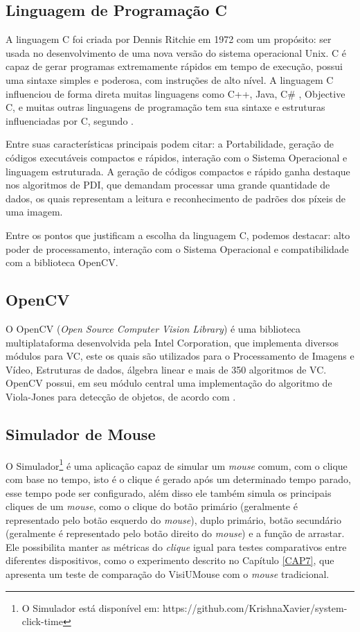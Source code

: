 \subsection{Linguagem de Programação C}

A linguagem C foi criada por Dennis Ritchie em 1972 com um propósito: ser usada no desenvolvimento de uma nova versão do sistema operacional Unix. C é capaz de gerar programas extremamente rápidos em tempo de execução, possui uma sintaxe simples e poderosa, com instruções de alto nível. A linguagem C influenciou de forma direta muitas linguagens como C++, Java, C\# , Objective C, e muitas outras linguagens de programação tem sua sintaxe e estruturas influenciadas por C, segundo .

Entre suas características principais podem citar: a Portabilidade, geração de códigos executáveis compactos e rápidos, interação com o Sistema Operacional e linguagem estruturada. A geração de códigos compactos e rápido ganha destaque nos algoritmos de PDI, que demandam processar uma grande quantidade de dados, os quais representam a leitura e reconhecimento de padrões dos píxeis de uma imagem.

Entre os pontos que justificam a escolha da linguagem C, podemos destacar: alto poder de processamento, interação com o Sistema Operacional e compatibilidade com a biblioteca OpenCV.

\subsection{OpenCV}

O OpenCV (\textit{Open Source Computer Vision Library}) é uma biblioteca multiplataforma desenvolvida pela Intel Corporation, que implementa diversos módulos para VC, este os quais são utilizados para o Processamento de Imagens e Vídeo, Estruturas de dados, álgebra linear e mais de 350 algoritmos de VC. OpenCV possui, em seu módulo central uma implementação do algoritmo de Viola-Jones para detecção de objetos, de acordo com \cite{bradski2008learning}.

\subsection{Simulador de Mouse}

O Simulador\footnote{O Simulador está disponível em: https://github.com/KrishnaXavier/system-click-time} é uma aplicação capaz de simular um \textit{mouse} comum, com o clique com base no tempo, isto é o clique é gerado após um determinado tempo parado, esse tempo pode ser configurado, além disso ele também simula os principais cliques de um \textit{mouse}, como o clique do botão primário (geralmente é representado pelo botão esquerdo do \textit{mouse}), duplo primário, botão secundário (geralmente é representado pelo botão direito do \textit{mouse}) e a função de arrastar. Ele possibilita manter as métricas do \textit{clique} igual para testes comparativos entre diferentes dispositivos, como o experimento descrito no Capítulo \ref{CAP7}, que apresenta um teste de comparação do VisiUMouse com o \textit{mouse} tradicional.


